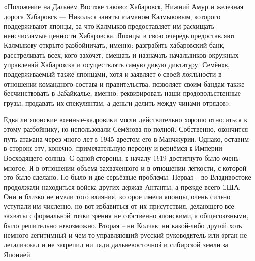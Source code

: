«Положение на Дальнем Востоке таково: Хабаровск, Нижний Амур и железная дорога Хабаровск — Никольск заняты атаманом Калмыковым, которого поддерживают японцы, за что Калмыков предоставляет им расхищать неисчислимые ценности Хабаровска. Японцы в свою очередь предоставляют Калмыкову открыто разбойничать, именно: разграбить хабаровский банк, расстреливать всех, кого захочет, смещать и назначать начальников окружных управлений Хабаровска и осуществлять самую дикую диктатуру. Семёнов, поддерживаемый также японцами, хотя и заявляет о своей лояльности в отношении командного состава и правительства, позволяет своим бандам также бесчинствовать в Забайкалье, именно: реквизировать наши продовольственные грузы, продавать их спекулянтам, а деньги делить между чинами отрядов».

Едва ли японские военные-кадровики могли действительно хорошо относиться к этому разбойнику, но использовали Семёнова по полной. Собственно, окончится путь атамана через много лет в 1945 арестом его в Манчжурии. Однако, оставим в стороне эту, конечно, примечательную персону и вернёмся к Империи Восходящего солнца. С одной стороны, к началу 1919 достигнуто было очень многое. И в отношении объема захваченного и в отношении лёгкости, с которой это было сделано. Но было и две серьёзные проблемы. Первая – во Владивостоке продолжали находиться войска других держав Антанты, а прежде всего США. Они и близко не имели того влияния, которое имели японцы, очень сильно уступали им численно, но вот избавиться от их присутствия, делающего все захваты с формальной точки зрения не собственно японскими, а общесоюзными, было решительно невозможно. Вторая – ни Колчак, ни какой-либо другой хоть немного легитимный и чем-то управляющий русский руководитель или орган не легализовал и не закрепил ни пяди дальневосточной и сибирской земли за Японией.

